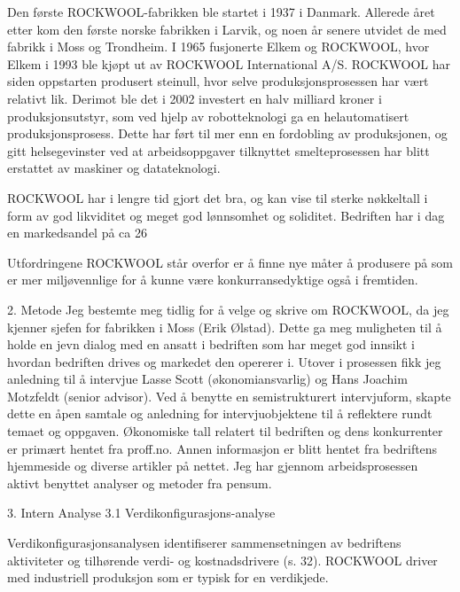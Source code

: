 Den første ROCKWOOL-fabrikken ble startet i 1937 i Danmark. Allerede året etter kom den første norske fabrikken i Larvik, og noen år senere utvidet de med fabrikk i Moss og Trondheim. I 1965 fusjonerte Elkem og ROCKWOOL, hvor Elkem i 1993 ble kjøpt ut av ROCKWOOL International A/S. ROCKWOOL har siden oppstarten produsert steinull, hvor selve produksjonsprosessen har vært relativt lik. Derimot ble det i 2002 investert en halv milliard kroner i produksjonsutstyr, som ved hjelp av robotteknologi ga en helautomatisert produksjonsprosess. Dette har ført til mer enn en fordobling av produksjonen, og gitt helsegevinster ved at arbeidsoppgaver tilknyttet smelteprosessen har blitt erstattet av maskiner og datateknologi.

ROCKWOOL har i lengre tid gjort det bra, og kan vise til sterke nøkkeltall i form av god likviditet og meget god lønnsomhet og soliditet. Bedriften har i dag en markedsandel på ca 26%

Utfordringene ROCKWOOL står overfor er å finne nye måter å produsere på som er mer miljøvennlige for å kunne være konkurransedyktige også i fremtiden.

2. Metode
Jeg bestemte meg tidlig for å velge og skrive om ROCKWOOL, da jeg kjenner sjefen for fabrikken i Moss (Erik Ølstad). Dette ga meg muligheten til å holde en jevn dialog med en ansatt i bedriften som har meget god innsikt i hvordan bedriften drives og markedet den opererer i. Utover i prosessen fikk jeg anledning til å intervjue Lasse Scott (økonomiansvarlig) og Hans Joachim Motzfeldt (senior advisor). Ved å benytte en semistrukturert intervjuform, skapte dette en åpen samtale og anledning for intervjuobjektene til å reflektere rundt temaet og oppgaven. Økonomiske tall relatert til bedriften og dens konkurrenter er primært hentet fra proff.no. Annen informasjon er blitt hentet fra bedriftens hjemmeside og diverse artikler på nettet. Jeg har gjennom arbeidsprosessen aktivt benyttet analyser og metoder fra pensum.

3. Intern Analyse
3.1 Verdikonfigurasjons-analyse

Verdikonfigurasjonsanalysen identifiserer sammensetningen av bedriftens aktiviteter og tilhørende verdi- og kostnadsdrivere (s. 32). ROCKWOOL driver med industriell produksjon som er typisk for en verdikjede.

